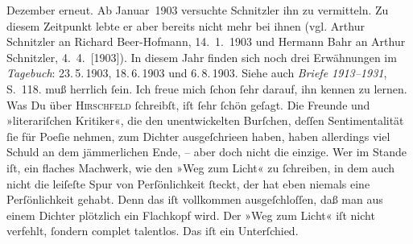\begin{ledgroupsized}[t]{13cm}
{{{                     Dezember erneut. Ab Januar 1903 versuchte
                     Schnitzler ihn zu vermitteln. Zu diesem
                  Zeitpunkt lebte er aber bereits nicht mehr bei ihnen (vgl. Arthur Schnitzler an Richard Beer-Hofmann, 14. 1. 1903 und Hermann Bahr an Arthur Schnitzler, 4. 4. [1903]). In diesem Jahr finden sich noch drei Erwähnungen
                  im \emph{Tagebuch}: 23. 5. 1903, 18. 6. 1903 und 6. 8. 1903. Siehe auch \emph{Briefe 1913–1931}, S. 118.}}}\label{K_L03204-2h} muß herrlich ſein. Ich
               freue mich ſchon ſehr darauf, ihn kennen zu lernen. {\pb}Was Du über \textsc{Hirschfeld} ſchreibſt, iſt ſehr ſchön geſagt. Die Freunde und »literariſchen Kritiker«, die
               den unentwickelten Burſchen,
               deſſen Sentimentalität ſie für Poeſie nehmen, zum Dichter ausgeſchrieen haben, haben
               allerdings viel Schuld an dem jämmerlichen Ende, – aber doch nicht die einzige. Wer
               im Stande iſt, ein flaches Machwerk, wie den »Weg zum
                  Licht« zu ſchreiben, in dem auch nicht die leiſeſte Spur von Perſönlichkeit
               ſteckt, der hat eben niemals eine Perſönlichkeit gehabt. Denn das iſt vollkommen
               ausgeſchloſſen, daß man aus einem Dichter {\pb}plötzlich
               ein Flachkopf wird. Der »Weg zum Licht« iſt
               nicht verfehlt, ſondern complet talentlos. Das iſt ein Unterſchied.\pend
           \pstart

\end{ledgroupsized}

